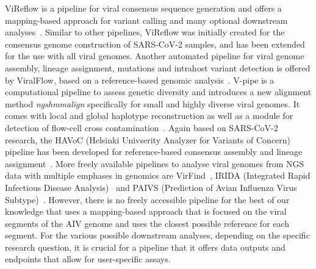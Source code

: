 ViReflow is a pipeline for viral consensus sequence generation and offers a mapping-based approach for variant calling and many optional downstream analyses~\cite{moshiri2022vireflow}. Similar to other pipelines, ViReflow was initially created for the consensus genome construction of SARS-CoV-2 samples, and has been extended for the use with all viral genomes. Another automated pipeline for viral genome assembly, lineage assignment, mutations and intrahost variant detection is offered by ViralFlow, based on a reference-based genomic analysis~\cite{dezordi2022viralflow}. V-pipe is a computational pipeline to assess genetic diversity and introduces a new alignment method \textit{ngshmmalign} specifically for small and highly diverse viral genomes. It comes with local and global haplotype reconstruction as well as a module for detection of flow-cell cross contamination~\cite{posada2021v}. Again based on SARS-CoV-2 research, the HAVoC (Helsinki Univserity Analyzer for Variants of Concern) pipeline has been developed for reference-based consensus assembly and lineage assignment~\cite{truong2021havoc}. More freely available pipelines to analyse viral genomes from NGS data with multiple emphases in genomics are VirFind~\cite{ho2014development}, IRIDA (Integrated Rapid Infectious Disease Analysis)~\cite{matthews2018integrated} and PAIVS (Prediction of Avian Influenza Virus Subtype)~\cite{park2020paivs}. However, there is no freely accessible pipeline for the best of our knowledge that uses a mapping-based approach that is focused on the viral segments of the AIV genome and uses the closest possible reference for each segment. For the various possible downstream analyses, depending on the specific research question, it is crucial for a pipeline that it offers data outputs and endpoints that allow for user-specific assays.
